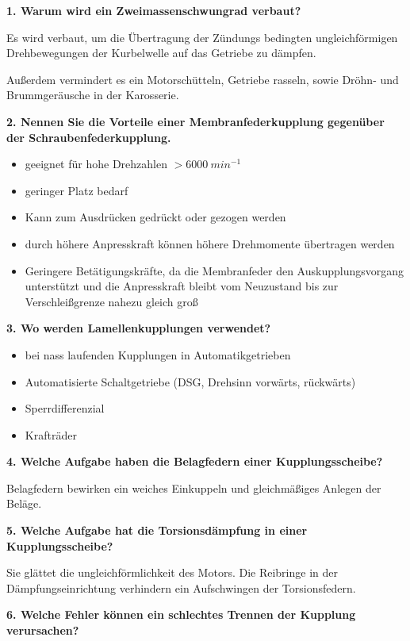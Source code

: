 \textbf{1. Warum wird ein Zweimassenschwungrad verbaut?}

Es wird verbaut, um die Übertragung der Zündungs bedingten
ungleichförmigen Drehbewegungen der Kurbelwelle auf das Getriebe zu
dämpfen.

Außerdem vermindert es ein Motorschütteln, Getriebe rasseln, sowie
Dröhn- und Brummgeräusche in der Karosserie.

\textbf{2. Nennen Sie die Vorteile einer Membranfederkupplung gegenüber
der Schraubenfederkupplung.}

\begin{itemize}
\item
  geeignet für hohe Drehzahlen $>6000~min^{-1}$
\item
  geringer Platz bedarf
\item
  Kann zum Ausdrücken gedrückt oder gezogen werden
\item
  durch höhere Anpresskraft können höhere Drehmomente übertragen werden
\item
  Geringere Betätigungskräfte, da die Membranfeder den
  Auskupplungsvorgang unterstützt und die Anpresskraft bleibt vom
  Neuzustand bis zur Verschleißgrenze nahezu gleich groß
\end{itemize}

\textbf{3. Wo werden Lamellenkupplungen verwendet?}

\begin{itemize}
\item
  bei nass laufenden Kupplungen in Automatikgetrieben
\item
  Automatisierte Schaltgetriebe (DSG, Drehsinn vorwärts, rückwärts)
\item
  Sperrdifferenzial
\item
  Krafträder
\end{itemize}

\textbf{4. Welche Aufgabe haben die Belagfedern einer Kupplungsscheibe?}

Belagfedern bewirken ein weiches Einkuppeln und gleichmäßiges Anlegen
der Beläge.

\textbf{5. Welche Aufgabe hat die Torsionsdämpfung in einer
Kupplungsscheibe?}

Sie glättet die ungleichförmlichkeit des Motors. Die Reibringe in der
Dämpfungseinrichtung verhindern ein Aufschwingen der Torsionsfedern.

\textbf{6. Welche Fehler können ein schlechtes Trennen der Kupplung
verursachen?}

